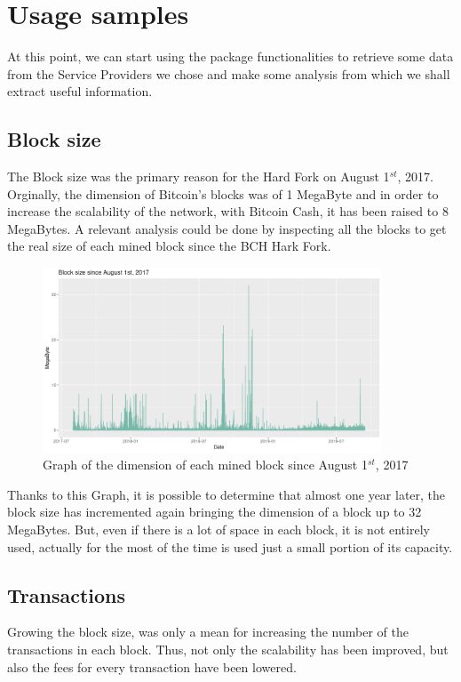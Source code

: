 \chapter{Usage samples}
\label{cha:sample}
At this point, we can start using the package functionalities to retrieve some data 
from the Service Providers we chose and make some analysis from which we shall
extract useful information.

\section{Block size}
The Block size was the primary reason for the Hard Fork on August 1$^{st}$, 2017. Orginally,
the dimension of Bitcoin's blocks was of 1 MegaByte and in order to increase the 
scalability of the network, with Bitcoin Cash, it has been raised to 8 MegaBytes.
A relevant analysis could be done by inspecting all the blocks to 
get the real size of each mined block since the BCH Hark Fork.

\begin{figure}[h]
    \centering
    \includegraphics[width = 0.9\textwidth]{blocksize2.png}
    \caption{Graph of the dimension of each mined block since August 1$^{st}$, 2017}
    \label{fig:request}
\end{figure}

Thanks to this Graph, it is possible to determine that almost one year later, the block 
size has incremented again bringing the dimension of a block up to 32 MegaBytes. 
But, even if there is a lot of space in each block, it is not entirely used, 
actually for the most of the time is used just a small portion of its capacity.\\
\pagebreak

\section{Transactions}
Growing the block size, was only a mean for increasing the number of the transactions 
in each block. Thus, not only the scalability has been improved, but also the fees for every 
transaction have been lowered.

